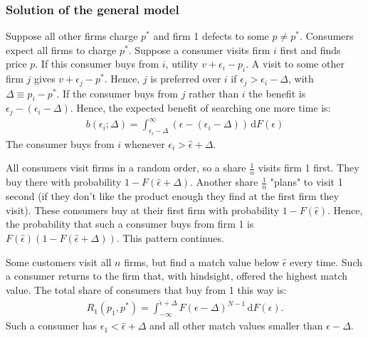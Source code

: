 \documentclass[12pt]{article}
\numberwithin{equation}{section}
\renewcommand{\d}[1]{\,\textrm{d}#1}
\newcommand{\1}[1]{\,\mathbbm{1}_{#1}} %
\begin{document}
\subsubsection{Solution of the general model}
Suppose all other firms charge $p^*$ and firm 1 defects to some
$p\neq p^*$. Consumers expect all firms to charge $p^*$. Suppose a
consumer visits firm $i$ first and finds price $p$. If this consumer buys
from $i$, utility $v+\epsilon_i-p_i$. A visit to some other firm $j$ gives
$v+\epsilon_j-p^*$. Hence, $j$ is preferred over $i$ if
$\epsilon_j>\epsilon_i-\Delta$, with $\Delta\equiv p_i-p^*$. If the
consumer buys from $j$ rather than $i$ the benefit is
$\epsilon_j-(\epsilon_i-\Delta)$. Hence, the expected benefit of
searching one more time is:
\begin{align}
	b(\epsilon_i;\Delta)=\int_{\epsilon_i-\Delta}^\infty(\epsilon-(\epsilon_i-\Delta))\d F(\epsilon)
\end{align}
The consumer buys from $i$ whenever $\epsilon_i>\hat\epsilon+\Delta$.

All consumers visit firms in a random order, so a share $\frac{1}{n}$
visits firm 1 first. They buy there with probability $1-F(\hat\epsilon+\Delta)$.
Another share $\frac{1}{n}$ "plans" to visit 1 second (if they don't
like the product enough they find at the first firm they visit). These
consumers buy at their first firm with probability $1-F(\hat\epsilon)$.
Hence, the probability that such a consumer buys from firm 1 is
$F(\hat\epsilon)(1-F(\hat\epsilon+\Delta))$. This pattern continues.

Some customers visit all $n$ firms, but find a match value below $\hat\epsilon$
every time. Such a consumer returns to the firm that, with hindsight,
offered the highest match value. The total share of consumers that buy
from 1 this way is:
\begin{align}
	R_1(p_1,p^*)=\int_{-\infty}^{\hat\epsilon+\Delta}F(\epsilon-\Delta)^{N-1}\d F(\epsilon).
\end{align}
Such a consumer has $\epsilon_1<\hat\epsilon+\Delta$ and all other match
values smaller than $\epsilon-\Delta$.
\end{document}

